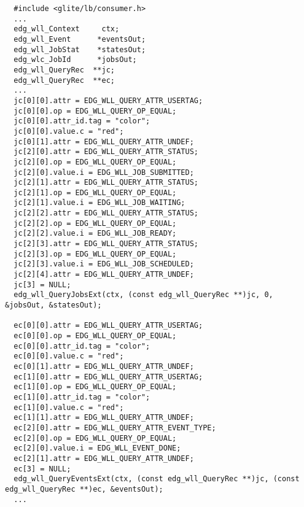 \begin{verbatim}
  #include <glite/lb/consumer.h>
  ...
  edg_wll_Context     ctx;    
  edg_wll_Event      *eventsOut;
  edg_wll_JobStat    *statesOut;
  edg_wlc_JobId      *jobsOut;
  edg_wll_QueryRec  **jc;
  edg_wll_QueryRec  **ec;
  ...
  jc[0][0].attr = EDG_WLL_QUERY_ATTR_USERTAG;
  jc[0][0].op = EDG_WLL_QUERY_OP_EQUAL;
  jc[0][0].attr_id.tag = "color";
  jc[0][0].value.c = "red";
  jc[0][1].attr = EDG_WLL_QUERY_ATTR_UNDEF;
  jc[2][0].attr = EDG_WLL_QUERY_ATTR_STATUS;
  jc[2][0].op = EDG_WLL_QUERY_OP_EQUAL;
  jc[2][0].value.i = EDG_WLL_JOB_SUBMITTED;
  jc[2][1].attr = EDG_WLL_QUERY_ATTR_STATUS;
  jc[2][1].op = EDG_WLL_QUERY_OP_EQUAL;
  jc[2][1].value.i = EDG_WLL_JOB_WAITING;
  jc[2][2].attr = EDG_WLL_QUERY_ATTR_STATUS;
  jc[2][2].op = EDG_WLL_QUERY_OP_EQUAL;
  jc[2][2].value.i = EDG_WLL_JOB_READY;
  jc[2][3].attr = EDG_WLL_QUERY_ATTR_STATUS;
  jc[2][3].op = EDG_WLL_QUERY_OP_EQUAL;
  jc[2][3].value.i = EDG_WLL_JOB_SCHEDULED;
  jc[2][4].attr = EDG_WLL_QUERY_ATTR_UNDEF;
  jc[3] = NULL;
  edg_wll_QueryJobsExt(ctx, (const edg_wll_QueryRec **)jc, 0, &jobsOut, &statesOut);

  ec[0][0].attr = EDG_WLL_QUERY_ATTR_USERTAG;
  ec[0][0].op = EDG_WLL_QUERY_OP_EQUAL;
  ec[0][0].attr_id.tag = "color";
  ec[0][0].value.c = "red";
  ec[0][1].attr = EDG_WLL_QUERY_ATTR_UNDEF;
  ec[1][0].attr = EDG_WLL_QUERY_ATTR_USERTAG;
  ec[1][0].op = EDG_WLL_QUERY_OP_EQUAL;
  ec[1][0].attr_id.tag = "color";
  ec[1][0].value.c = "red";
  ec[1][1].attr = EDG_WLL_QUERY_ATTR_UNDEF;
  ec[2][0].attr = EDG_WLL_QUERY_ATTR_EVENT_TYPE;
  ec[2][0].op = EDG_WLL_QUERY_OP_EQUAL;
  ec[2][0].value.i = EDG_WLL_EVENT_DONE;
  ec[2][1].attr = EDG_WLL_QUERY_ATTR_UNDEF;
  ec[3] = NULL;
  edg_wll_QueryEventsExt(ctx, (const edg_wll_QueryRec **)jc, (const edg_wll_QueryRec **)ec, &eventsOut);
  ...
\end{verbatim}
\fi

